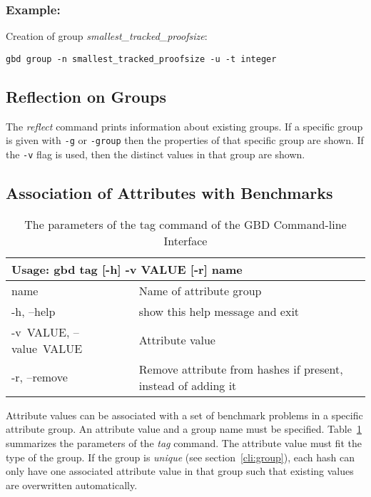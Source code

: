 \documentclass{easychair}
\begin{document}
\subsubsection{Example:}Creation of group \emph{smallest\_tracked\_proofsize}:
\begin{verbatim}
gbd group -n smallest_tracked_proofsize -u -t integer
\end{verbatim}


\subsection{Reflection on Groups}
\label{cli:reflect}

The \emph{reflect} command prints information about existing groups. If a specific group is given with \texttt{-g} or \texttt{\textendash-group} then the properties of that specific group are shown. If the \texttt{-v} flag is used, then the distinct values in that group are shown. 


\subsection{Association of Attributes with Benchmarks}
\label{cli:tag}

\begin{table}[ht]
\begin{tabular}{p{.23\linewidth}|p{.73\linewidth}}
\multicolumn{2}{l}{\bf Usage: \textsf{gbd tag [-h] -v VALUE [-r] name}}\\

\hline
  \sf name                  &Name of attribute group\\

  \sf -h, --help            &show this help message and exit\\
  \sf \mbox{-v VALUE}, \mbox{--value VALUE}
                        &Attribute value\\
  \sf -r, --remove          &Remove attribute from hashes if present, instead of
                        adding it
\end{tabular}
\caption{The parameters of the tag command of the GBD Command-line Interface}
\label{fig:cli:tag}
\end{table}

Attribute values can be associated with a set of benchmark problems in a specific attribute group. 
An attribute value and a group name must be specified. 
Table~\ref{fig:cli:tag} summarizes the parameters of the \emph{tag} command. 
The attribute value must fit the type of the group.
If the group is \emph{unique} (see section~\ref{cli:group}), each hash can only have one associated attribute value in that group such that existing values are overwritten automatically.
\end{document}
